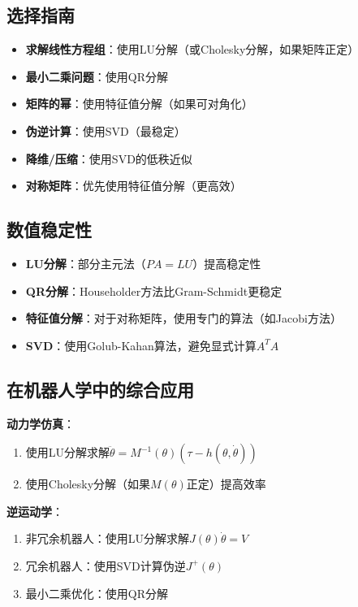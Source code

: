 \documentclass[12pt,a4paper]{article}
\begin{document}
\subsection{选择指南}

\begin{itemize}
\item \textbf{求解线性方程组}：使用LU分解（或Cholesky分解，如果矩阵正定）
\item \textbf{最小二乘问题}：使用QR分解
\item \textbf{矩阵的幂}：使用特征值分解（如果可对角化）
\item \textbf{伪逆计算}：使用SVD（最稳定）
\item \textbf{降维/压缩}：使用SVD的低秩近似
\item \textbf{对称矩阵}：优先使用特征值分解（更高效）
\end{itemize}

\subsection{数值稳定性}

\begin{itemize}
\item \textbf{LU分解}：部分主元法（$PA = LU$）提高稳定性
\item \textbf{QR分解}：Householder方法比Gram-Schmidt更稳定
\item \textbf{特征值分解}：对于对称矩阵，使用专门的算法（如Jacobi方法）
\item \textbf{SVD}：使用Golub-Kahan算法，避免显式计算$A^T A$
\end{itemize}

\subsection{在机器人学中的综合应用}

\textbf{动力学仿真}：
\begin{enumerate}
\item 使用LU分解求解$\ddot{\theta} = M^{-1}(\theta)(\tau - h(\theta, \dot{\theta}))$
\item 使用Cholesky分解（如果$M(\theta)$正定）提高效率
\end{enumerate}

\textbf{逆运动学}：
\begin{enumerate}
\item 非冗余机器人：使用LU分解求解$J(\theta) \dot{\theta} = V$
\item 冗余机器人：使用SVD计算伪逆$J^+(\theta)$
\item 最小二乘优化：使用QR分解
\end{enumerate}
\end{document}
